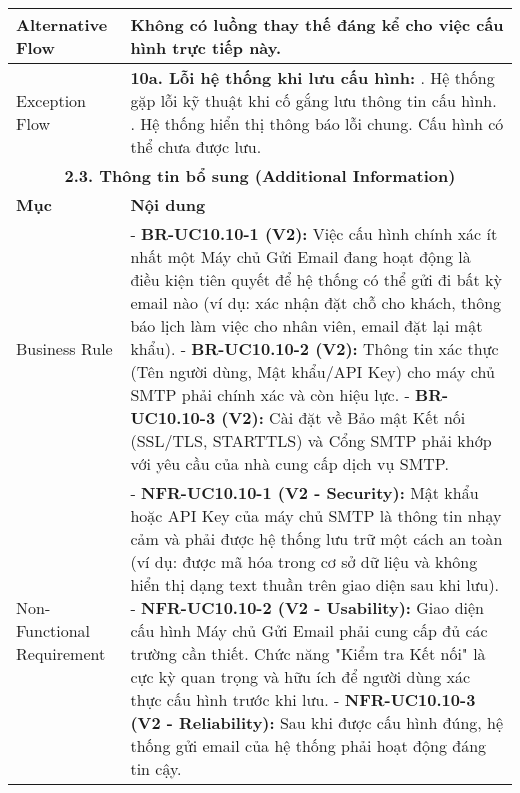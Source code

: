 \begin{longtable}{|m{4cm}|p{11cm}|}
\hline
Alternative Flow & Không có luồng thay thế đáng kể cho việc cấu hình trực tiếp này. \\
\hline
Exception Flow & \textbf{10a. Lỗi hệ thống khi lưu cấu hình:} \newline    1. Hệ thống gặp lỗi kỹ thuật khi cố gắng lưu thông tin cấu hình. \newline    2. Hệ thống hiển thị thông báo lỗi chung. Cấu hình có thể chưa được lưu. \\
\hline
\multicolumn{2}{|c|}{\textbf{2.3. Thông tin bổ sung (Additional Information)}} \\
\hline
\textbf{Mục} & \textbf{Nội dung} \\
\hline
Business Rule & - \textbf{BR-UC10.10-1 (V2):} Việc cấu hình chính xác ít nhất một Máy chủ Gửi Email đang hoạt động là điều kiện tiên quyết để hệ thống có thể gửi đi bất kỳ email nào (ví dụ: xác nhận đặt chỗ cho khách, thông báo lịch làm việc cho nhân viên, email đặt lại mật khẩu). \newline - \textbf{BR-UC10.10-2 (V2):} Thông tin xác thực (Tên người dùng, Mật khẩu/API Key) cho máy chủ SMTP phải chính xác và còn hiệu lực. \newline - \textbf{BR-UC10.10-3 (V2):} Cài đặt về Bảo mật Kết nối (SSL/TLS, STARTTLS) và Cổng SMTP phải khớp với yêu cầu của nhà cung cấp dịch vụ SMTP. \\
\hline
Non-Functional Requirement & - \textbf{NFR-UC10.10-1 (V2 - Security):} Mật khẩu hoặc API Key của máy chủ SMTP là thông tin nhạy cảm và phải được hệ thống lưu trữ một cách an toàn (ví dụ: được mã hóa trong cơ sở dữ liệu và không hiển thị dạng text thuần trên giao diện sau khi lưu). \newline - \textbf{NFR-UC10.10-2 (V2 - Usability):} Giao diện cấu hình Máy chủ Gửi Email phải cung cấp đủ các trường cần thiết. Chức năng "Kiểm tra Kết nối" là cực kỳ quan trọng và hữu ích để người dùng xác thực cấu hình trước khi lưu. \newline - \textbf{NFR-UC10.10-3 (V2 - Reliability):} Sau khi được cấu hình đúng, hệ thống gửi email của hệ thống phải hoạt động đáng tin cậy. \\
\hline
\end{longtable}


